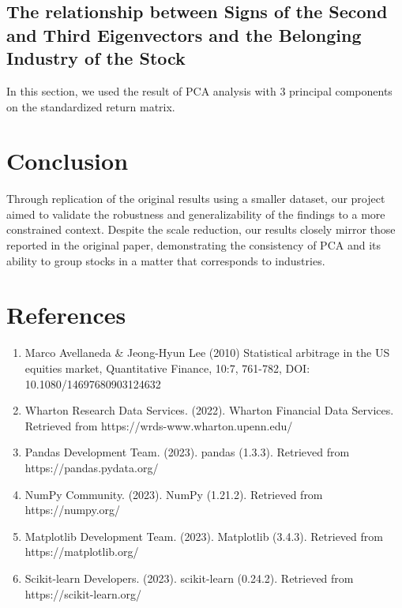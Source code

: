 \documentclass[12pt, letterpaper, twoside]{article}
\begin{document}
    \subsection{The relationship between 
    Signs of the Second and Third Eigenvectors 
    and the Belonging Industry of the Stock}

    In this section, we used the result of PCA analysis 
    with 3 principal components on the standardized 
    return matrix. 

    
    \section{Conclusion}
    Through replication of the original results using 
    a smaller dataset, our project aimed to 
    validate the robustness and generalizability 
    of the findings to a more constrained context. 
    Despite the scale reduction, our results closely 
    mirror those reported in the original paper, 
    demonstrating the consistency of PCA and its 
    ability to group stocks in a matter that 
    corresponds to industries.

    \section*{References}
    \begin{enumerate}
        \item Marco Avellaneda \& Jeong-Hyun Lee (2010) Statistical arbitrage in the US equities market, Quantitative Finance, 10:7, 761-782, DOI: 10.1080/14697680903124632
        \item Wharton Research Data Services. (2022). Wharton Financial Data Services. Retrieved from https://wrds-www.wharton.upenn.edu/
        \item Pandas Development Team. (2023). pandas (1.3.3). Retrieved from https://pandas.pydata.org/
        \item NumPy Community. (2023). NumPy (1.21.2). Retrieved from https://numpy.org/
        \item Matplotlib Development Team. (2023). Matplotlib (3.4.3). Retrieved from https://matplotlib.org/
        \item Scikit-learn Developers. (2023). scikit-learn (0.24.2). Retrieved from https://scikit-learn.org/
    \end{enumerate}
\end{document}
